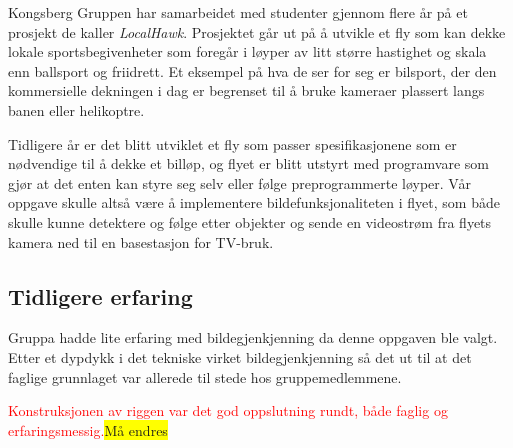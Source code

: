 Kongsberg Gruppen har samarbeidet med studenter gjennom flere år på et prosjekt de kaller \emph{LocalHawk}. Prosjektet går ut på å utvikle et fly som kan dekke lokale sportsbegivenheter som foregår i løyper av litt større hastighet og skala enn ballsport og friidrett. Et eksempel på hva de ser for seg er bilsport, der den kommersielle dekningen i dag er begrenset til å bruke kameraer plassert langs banen eller helikoptre.

Tidligere år er det blitt utviklet et fly som passer spesifikasjonene som er nødvendige til å dekke et billøp, og flyet er blitt utstyrt med programvare som gjør at det enten kan styre seg selv eller følge preprogrammerte løyper. Vår oppgave skulle altså være å implementere bildefunksjonaliteten i flyet, som både skulle kunne detektere og følge etter objekter og sende en videostrøm fra flyets kamera ned til en basestasjon for TV-bruk.

\subsection{Tidligere erfaring}

Gruppa hadde lite erfaring med bildegjenkjenning da denne oppgaven ble valgt. Etter et dypdykk i det tekniske virket bildegjenkjenning så det ut til at det faglige grunnlaget var allerede til stede hos gruppemedlemmene.

\textcolor{red}{Konstruksjonen av riggen var det god oppslutning rundt, både faglig og erfaringsmessig.}\colorbox{yellow}{Må endres}
